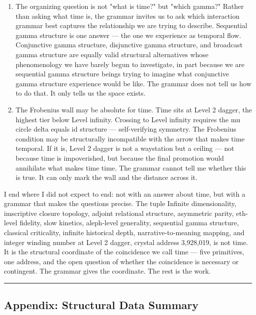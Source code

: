 \documentclass[12pt,a4paper]{article}
\begin{document}
\begin{enumerate}
    \item The organizing question is not "what is time?" but "which gamma?" Rather than asking what time is, the grammar invites us to ask which interaction grammar best captures the relationship we are trying to describe. Sequential gamma structure is one answer --- the one we experience as temporal flow. Conjunctive gamma structure, disjunctive gamma structure, and broadcast gamma structure are equally valid structural alternatives whose phenomenology we have barely begun to investigate, in part because we are sequential gamma structure beings trying to imagine what conjunctive gamma structure experience would be like. The grammar does not tell us how to do that. It only tells us the space exists.
    \item The Frobenius wall may be absolute for time. Time sits at Level 2 dagger, the highest tier below Level infinity. Crossing to Level infinity requires the mu circle delta equals id structure --- self-verifying symmetry. The Frobenius condition may be structurally incompatible with the arrow that makes time temporal. If it is, Level 2 dagger is not a waystation but a ceiling --- not because time is impoverished, but because the final promotion would annihilate what makes time time. The grammar cannot tell me whether this is true. It can only mark the wall and the distance across it.
\end{enumerate}

I end where I did not expect to end: not with an answer about time, but with a grammar that makes the questions precise. The tuple Infinite dimensionality, imscriptive closure topology, adjoint relational structure, asymmetric parity, eth-level fidelity, slow kinetics, aleph-level generality, sequential gamma structure, classical criticality, infinite historical depth, narrative-to-meaning mapping, and integer winding number at Level 2 dagger, crystal address 3,928,019, is not time. It is the structural coordinate of the coincidence we call time --- five primitives, one address, and the open question of whether the coincidence is necessary or contingent. The grammar gives the coordinate. The rest is the work.

\begin{center}
\rule{0.5\textwidth}{0.4pt}
\end{center}

\subsection{Appendix: Structural Data Summary}
\end{document}
